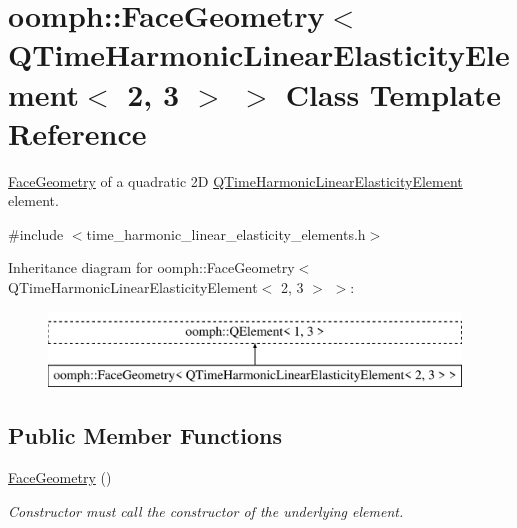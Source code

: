 \hypertarget{classoomph_1_1FaceGeometry_3_01QTimeHarmonicLinearElasticityElement_3_012_00_013_01_4_01_4}{}\section{oomph\+:\+:Face\+Geometry$<$ Q\+Time\+Harmonic\+Linear\+Elasticity\+Element$<$ 2, 3 $>$ $>$ Class Template Reference}
\label{classoomph_1_1FaceGeometry_3_01QTimeHarmonicLinearElasticityElement_3_012_00_013_01_4_01_4}


\hyperlink{classoomph_1_1FaceGeometry}{Face\+Geometry} of a quadratic 2D \hyperlink{classoomph_1_1QTimeHarmonicLinearElasticityElement}{Q\+Time\+Harmonic\+Linear\+Elasticity\+Element} element.  




{\ttfamily \#include $<$time\+\_\+harmonic\+\_\+linear\+\_\+elasticity\+\_\+elements.\+h$>$}

Inheritance diagram for oomph\+:\+:Face\+Geometry$<$ Q\+Time\+Harmonic\+Linear\+Elasticity\+Element$<$ 2, 3 $>$ $>$\+:\begin{figure}[H]
\begin{center}
\leavevmode
\includegraphics[height=2.000000cm]{classoomph_1_1FaceGeometry_3_01QTimeHarmonicLinearElasticityElement_3_012_00_013_01_4_01_4}
\end{center}
\end{figure}
\subsection*{Public Member Functions}
\begin{DoxyCompactItemize}
\item 
\hyperlink{classoomph_1_1FaceGeometry_3_01QTimeHarmonicLinearElasticityElement_3_012_00_013_01_4_01_4_a105956d2938e63d81aaca232b12aede6}{Face\+Geometry} ()
\begin{DoxyCompactList}\small\item\em Constructor must call the constructor of the underlying element. \end{DoxyCompactList}\end{DoxyCompactItemize}


